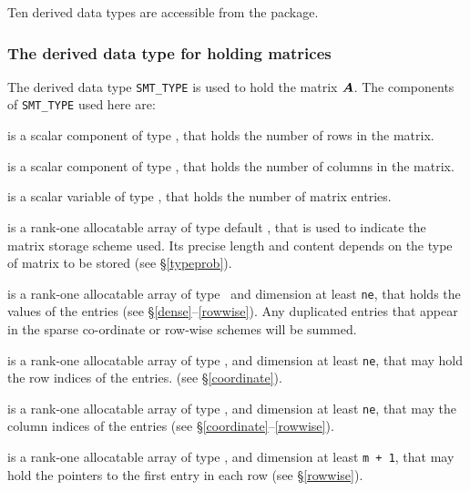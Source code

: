 \documentclass{galahad}
\begin{document}



\galtypes
Ten derived data types are accessible from the package.


\subsubsection{The derived data type for holding matrices}\label{typesmt}
The derived data type {\tt SMT\_TYPE} is used to hold the matrix ${\bm{A}}$.
The components of {\tt SMT\_TYPE} used here are:

\begin{description}

 is a scalar component of type \integer,
that holds the number of rows in the matrix.

 is a scalar component of type \integer,
that holds the number of columns in the matrix.

 is a scalar variable of type \integer, that
holds the number of matrix entries.

 is a rank-one allocatable array of type default \character, that
is used to indicate the matrix storage scheme used. Its precise length and
content depends on the type of matrix to be stored (see \S\ref{typeprob}).

 is a rank-one allocatable array of type \realdp\,
and dimension at least {\tt ne}, that holds the values of the entries
(see \S\ref{dense}--\ref{rowwise}).
Any duplicated entries that appear in the sparse
co-ordinate or row-wise schemes will be summed.

 is a rank-one allocatable array of type \integer,
and dimension at least {\tt ne}, that may hold the row indices of the entries.
(see \S\ref{coordinate}).

 is a rank-one allocatable array of type \integer,
and dimension at least {\tt ne}, that may the column indices of the entries
(see \S\ref{coordinate}--\ref{rowwise}).

 is a rank-one allocatable array of type \integer,
and dimension at least {\tt m + 1}, that may hold the pointers to
the first entry in each row (see \S\ref{rowwise}).

\end{description}

\end{document}
